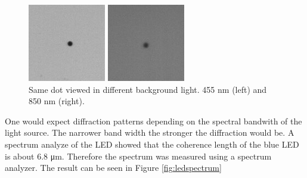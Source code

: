 \begin{figure}
\centering
\begin{minipage}{.5\textwidth}
  \centering
  \includegraphics[width=.6\linewidth]{figures/compare455nmdot}
\end{minipage}%
\begin{minipage}{.5\textwidth}
  \centering
  \includegraphics[width=.6\linewidth]{figures/compare850nmdot}
\end{minipage}
\caption{Same dot viewed in different background light. 455 nm (left) and 850 nm (right).}
\label{fig:comparedots}
\end{figure}

One would expect diffraction patterns depending on the spectral bandwith of the light source. The narrower band width the stronger the diffraction would be. A spectrum analyze of the LED showed that the coherence length of the blue LED is about 6.8 μm. Therefore the spectrum was measured using a spectrum analyzer. The result can be seen in Figure \ref{fig:ledspectrum}

